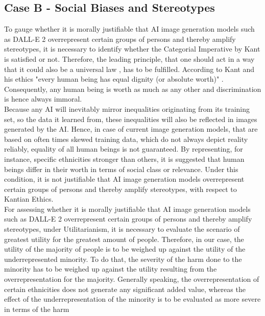 \documentclass[10pt,twocolumn,twoside]{osajnl}
\begin{document}
\subsection{Case B - Social Biases and Stereotypes}
To gauge whether it is morally justifiable that AI image generation models such as DALL-E 2 overrepresent certain groups of persons and thereby amplify stereotypes, it is necessary to 
identify whether the Categorial Imperative by Kant is satisfied or not. Therefore, the leading principle, that one should act in a way that it could also be a universal law \cite{kant}, has to be fulfilled. 
According to Kant and his ethics "every human being has equal dignity (or absolute worth)" \cite{kant}. Consequently, any human being is worth as much as any other and discrimination is hence always immoral. 
\\
Because any AI will inevitably mirror inequalities originating from its training set, so the data it learned from, these inequalities will also be reflected in images generated by the AI. 
Hence, in case of current image generation models, that are based on often times skewed training data, which do not always depict reality reliably, equality of all human beings is not guaranteed.
By representing, for instance, specific ethnicities stronger than others, it is suggested that human beings differ in their worth in terms of social class or relevance. 
Under this condition, it is not justifiable that AI image generation models overrepresent certain groups of persons and thereby amplify stereotypes, with respect to Kantian Ethics.
\\
For assessing whether it is morally justifiable that AI image generation models such as DALL-E 2 overrepresent certain groups of persons and thereby amplify stereotypes, under Utilitarianism,
it is necessary to evaluate the scenario of greatest utility for the greatest amount of people. Therefore, in our case, the utility of the majority of people is to be weighed up against the utility of the underrepresented 
minority. To do that, the severity of the harm done to the minority has to be weighed up against the utility resulting from the overrepresentation for the majority. Generally speaking, 
the overrepresentation of certain ethnicities does not generate any significant added value, whereas the effect of the underrepresentation of the minority is to be evaluated as more severe in terms of the harm 
\end{document}
